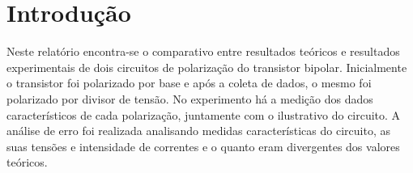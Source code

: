 \chapter*[Introdu\c{c}\~{a}o]{Introdu\c{c}\~{a}o}

Neste relatório encontra-se o comparativo entre resultados teóricos e resultados experimentais de dois circuitos de polarização do transistor bipolar.
Inicialmente o transistor foi polarizado por base e após a coleta de dados, o mesmo foi polarizado por divisor de tensão. 
No experimento há a medição dos dados característicos de cada polarização, juntamente com o ilustrativo do circuito. 
A análise de erro foi realizada analisando medidas características do circuito, as suas tensões e intensidade de correntes e o quanto eram divergentes dos valores teóricos. 

